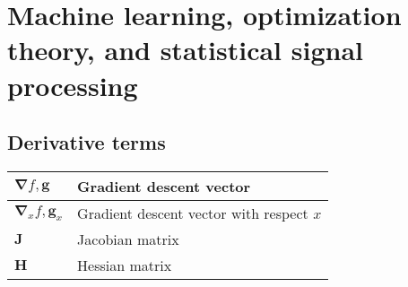 \documentclass{article}
\begin{document}
\section{Machine learning, optimization theory, and \newline statistical signal processing}
\subsection{Derivative terms}
\begin{xltabular}{\textwidth}{XX}
    \(\boldsymbol{\nabla}f, \mathbf{g}\)            & Gradient descent vector \\ \hline
    \(\boldsymbol{\nabla}_{x}f, \mathbf{g}_{x}\)    & Gradient descent vector with respect \(x\) \cite{bishopPatternRecognitionMachine2006}\\ \hline
    \(\mathbf{J}\)                                  & Jacobian matrix\\ \hline
    \(\mathbf{H}\)                                  & Hessian matrix \\ \hline
\end{xltabular}
\end{document}
